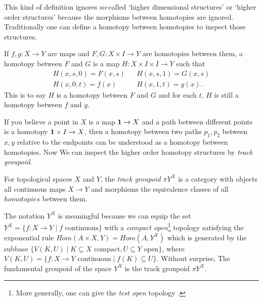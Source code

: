 This kind of definition ignores so-called `higher dimensional structures' 
or `higher order structures' because the morphisms between homotopies are
ignored. Traditionally one can define a homotopy between homotopies to
inspect those structures.

\begin{definition}
    If $f,g:X\to Y$ are maps and $F,G: X\times I\to Y$ are homotopies 
    between them, a homotopy between $F$ and $G$ is a map 
    $H: X\times I\times I\to Y$ such that
    $$
    \begin{array}{lcl}
        H(x,s,0) = F(x, s) & & H(x, s, 1) = G(x, s) \\
        H(x, 0, t) = f(x) & & H(x,1,t) = g(x).
    \end{array}
    $$
    This is to say $H$ is a homotopy between $F$ and $G$ and for each
    $t$, $H$ is still a homotopy between $f$ and $g$.
\end{definition}

If you believe a point in $X$ is a map $\mathbf{1}\to X$ and a path between
different points is a homotopy $\mathbf{1}\times I\to X$, then a homotopy
between two paths $p_1,p_2$ between $x,y$ relative to the endpoints
can be understood as a homotopy between homotopies.  
Now We can inspect the higher order homotopy structures by {\it track
groupoid}.

\begin{definition}
    For topological spaces $X$ and $Y$, the {\it track groupoid} $\pi Y^X$
    is a category with objects all continuous maps $X\to Y$ and morphisms
    the equivalence classes of all $homotopies$ between them. 
\end{definition}

The notation $Y^X$ is meaningful because we can equip the set $Y^X=\{
f: X\to Y\mid f\text{ continuous}\}$ with a {\it compact open}\footnote{
More generally, one can give the {\it test open} topology 
\cite{topology-and-groupoids}.} topology satisfying the exponential rule
$Hom(A\times X, Y)=Hom(A, Y^X)$ which is generated by the subbase
$\{V(K, U)\mid K\subseteq X\text{ compact},U\subseteq Y\text{ open}\}$,
where $V(K, U) = \{f: X\to Y\text{ continuous}\mid f(K)\subseteq U\}$.
Without surprise, The fundamental groupoid of the space $Y^X$ is the
track groupoid $\pi Y^X$. 

